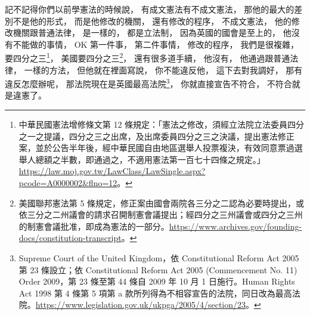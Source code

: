 \hypertarget{w06:cue:804}{}記不記得你們以前學憲法的時候說，
\hypertarget{w06:cue:805}{}有成文憲法有不成文憲法，
\hypertarget{w06:cue:806}{}那他的最大的差別不是他的形式，
\hypertarget{w06:cue:807}{}而是他修改的機關，
\hypertarget{w06:cue:808}{}還有修改的程序，
\hypertarget{w06:cue:809}{}不成文憲法，
\hypertarget{w06:cue:810}{}他的修改機關跟普通法律，
\hypertarget{w06:cue:811}{}是一樣的，
\hypertarget{w06:cue:812}{}都是立法制，
\hypertarget{w06:cue:813}{}因為英國的國會是至上的，
\hypertarget{w06:cue:814}{}他沒有不能做的事情，
\hypertarget{w06:cue:815}{}OK 第一件事，
\hypertarget{w06:cue:816}{}第二件事情，
\hypertarget{w06:cue:817}{}修改的程序，
\hypertarget{w06:cue:818}{}我們是很複雜，
\hypertarget{w06:cue:819}{}要四分之三\footnote{中華民國憲法增修條文第 12 條規定：「憲法之修改，須經立法院立法委員四分之一之提議，四分之三之出席，及出席委員四分之三之決議，提出憲法修正案，並於公告半年後，經中華民國自由地區選舉人投票複決，有效同意票過選舉人總額之半數，即通過之，不適用憲法第一百七十四條之規定。」\url{https://law.moj.gov.tw/LawClass/LawSingle.aspx?pcode=A0000002&flno=12}。}，
\hypertarget{w06:cue:820}{}美國要四分之三\footnote{美國聯邦憲法第 5 條規定，修正案由國會兩院各三分之二認為必要時提出，或依三分之二州議會的請求召開制憲會議提出；經四分之三州議會或四分之三州的制憲會議批准，即成為憲法的一部分。\url{https://www.archives.gov/founding-docs/constitution-transcript}。}，
\hypertarget{w06:cue:821}{}還有很多道手續，
\hypertarget{w06:cue:822}{}他沒有，
\hypertarget{w06:cue:823}{}他通過跟普通法律，
\hypertarget{w06:cue:824}{}一樣的方法，
\hypertarget{w06:cue:825}{}但他就在裡面寫說，
\hypertarget{w06:cue:826}{}你不能違反他，
\hypertarget{w06:cue:827}{}這下去對我調好，
\hypertarget{w06:cue:828}{}那有違反怎麼辦呢，
\hypertarget{w06:cue:829}{}那法院現在是英國最高法院\footnote{Supreme Court of the United Kingdom，依 Constitutional Reform Act 2005 第 23 條設立；依 Constitutional Reform Act 2005 (Commencement No. 11) Order 2009，第 23 條至第 44 條自 2009 年 10 月 1 日施行。Human Rights Act 1998 第 4 條第 5 項第 a 款所列得為不相容宣告的法院，同日改為最高法院。\url{https://www.legislation.gov.uk/ukpga/2005/4/section/23}。}，
\hypertarget{w06:cue:830}{}你就直接宣告不符合，
\hypertarget{w06:cue:831}{}不符合就是違憲了。

